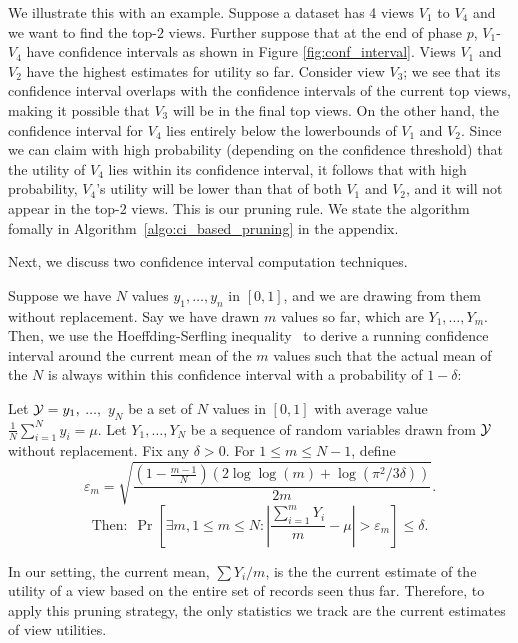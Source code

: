 We illustrate this with an example. Suppose a dataset has 4 views $V_1$
to $V_4$ and we want to find the top-$2$ views.
Further suppose that at the end of phase $p$,
$V_1$-$V_4$ have confidence intervals as shown in Figure \ref{fig:conf_interval}.
Views $V_1$ and $V_2$ have the highest estimates for utility so far.
Consider view $V_3$; we see that its confidence interval overlaps with the
confidence intervals of the current top views, making it possible
that $V_3$ will be in the final top views. On the other hand, the confidence
interval for $V_4$ lies entirely below the lowerbounds of $V_1$ and $V_2$.
Since we can claim with high probability (depending on the confidence threshold)
that the utility of $V_4$ lies within its confidence interval, it follows that
with high probability, $V_4$'s utility will be lower than that of both $V_1$ and
$V_2$, and it will not appear in the top-$2$ views.
This is our pruning rule. 
We state the algorithm fomally in
Algorithm~\ref{algo:ci_based_pruning} in the appendix.

Next, we discuss two confidence interval computation techniques.


Suppose we have $N$ values $y_1, \ldots, y_n$ in $[0, 1]$, and we are drawing
from them without replacement. 
Say we have drawn $m$ values so far, which are $Y_1, \ldots, Y_m$.
Then, we use the Hoeffding-Serfling inequality~\cite{serfling1974probability} 
to derive a running 
confidence interval around the current mean 
of the $m$ values such that the actual mean of the $N$
is always within this confidence interval with a probability of $1 - \delta$:
\begin{theorem}
\label{thm:hs}
Let $\mathcal{Y} = y_1,$ $\ldots,$ $y_N$ be a set of $N$ 
values in $[0,1]$ with average value
$\frac1N \sum_{i=1}^N y_i = \mu$.
Let $Y_1,\ldots,Y_N$ be a 
sequence of random variables drawn from $\mathcal{Y}$ without
replacement.
Fix any $\delta > 0$. For $1 \le m \le N-1$, define
$$
\varepsilon_m = \sqrt{\frac{(1-\frac{m-1}N)(2\log \log (m) + \log(\pi^2/3\delta))}{2m}}.
$$
$$
\textrm{Then:} \ \   \Pr\left[ \exists m, 1 \le m \le N : 
  \left|\frac{\sum_{i=1}^m Y_i}{m} - \mu\right| > \varepsilon_m \right] 
\le \delta.
$$

\end{theorem}
In our setting, the current mean, $\sum Y_i / m$, is the 
the current estimate of the utility of a view 
based on the entire set of records seen thus far. 
Therefore, to apply this pruning strategy, the only statistics
we track are the current estimates of view utilities.

